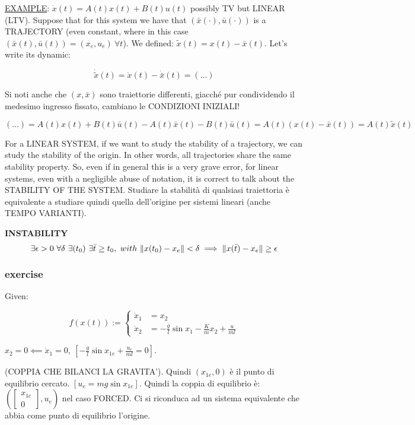\underline{EXAMPLE}: $\dot{x}(t) = A(t)x(t) + B(t)u(t)$ possibly TV but LINEAR (LTV). Suppose that for this system we have that $(\bar{x}(\mathord{\cdot}),\bar{u}(\mathord{\cdot}))$ is a TRAJECTORY (even constant, where in this case $(\bar{x}(t),\bar{u}(t)) = (x_e,u_e)\ \forall t$). We defined: $\tilde{x}(t) = x(t)-\bar{x}(t)$. Let's write its dynamic:

\[	
	\dot{\tilde{x}}(t) = \dot{x}(t) - \dot{\bar{x}}(t) = (\dots)
\]

Si noti anche che $(x,\bar{x})$ sono traiettorie differenti, giacché pur condividendo il medesimo ingresso fissato, cambiano le CONDIZIONI INIZIALI!

\[
	(\dots) = A(t)x(t) + B(t)\bar{u}(t) - A(t)\bar{x}(t) - B(t)\bar{u}(t) = A(t)(x(t)-\bar{x}(t)) = A(t)\tilde{x}(t)
\]

For a LINEAR SYSTEM, if we want to study the stability of a trajectory, we can study the stability of the origin. In other words, all trajectories share the same stability property. So, even if in general this is a very grave error, for linear systems, even with a negligible abuse of notation, it is correct to talk about the STABILITY OF THE SYSTEM.
Studiare la stabilità di qualsiasi traiettoria è equivalente a studiare quindi quella dell'origine per sistemi lineari (anche TEMPO VARIANTI).

\begin{defn}{\textbf{INSTABILITY}}
\[
	\exists \epsilon > 0\ \forall \delta\ \exists(t_0)\ \exists \bar{t} \geq t_0,\ with\ \norma{x(t_0)-x_e} < \delta \implies \norma{x(\bar{t})-x_e} \geq \epsilon
\]
\end{defn}

\subsubsection{exercise}

Given:

\[
	f(x(t)) := \left\{
	\begin{aligned}
	\dot{x}_1 &= x_2 \\
	\dot{x}_2 &= -\frac{g}{l}\sin{x_1} - \frac{K}{m}x_2 + \frac{u}{ml}
	\end{aligned} 
	\right.
\]

$x_2 = 0 \impliedby \dot{x}_1 = 0,\ [-\frac{g}{l}\sin{x_{1e}} + \frac{u_e}{ml} = 0]$.

(COPPIA CHE BILANCI LA GRAVITA'). Quindi $(x_{1e},0)$ è il punto di equilibrio cercato. $[u_e = mg\sin{x_{1e}}]$. Quindi la coppia di equilibrio è: $(\begin{bmatrix}x_{1e}\\0\end{bmatrix},u_e)$ nel caso FORCED. Ci si riconduca ad un sistema equivalente che abbia come punto di equilibrio l'origine.

